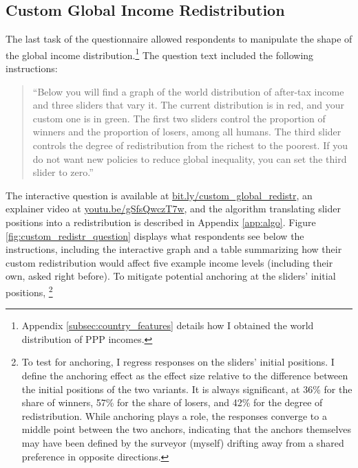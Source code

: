 \documentclass[12pt,english]{article}
\begin{document}
\begin{bibunit}

\subsection{Custom Global Income Redistribution}\label{subsec:custom_redistr}

The last task of the questionnaire allowed respondents to manipulate the shape of the global income distribution.\footnote{Appendix \ref{subsec:country_features} details how I obtained the world distribution of PPP incomes. } The question text included the following instructions: 
\begin{quote}``Below you will find a graph of the world distribution of after-tax income and three sliders that vary it. The current distribution is in red, and your custom one is in green. The first two sliders control the proportion of winners and the proportion of losers, among all humans. The third slider controls the degree of redistribution from the richest to the poorest. 
If you do not want new policies to reduce global inequality, you can set the third slider to zero.''\end{quote} 
The interactive question is available at \href{http://preferences-pol.fr/custom_global_redistr.html}{bit.ly/custom\_global\_redistr}, an explainer video at \href{https://youtu.be/gSfsQwczT7w}{youtu.be/gSfsQwczT7w}, and the algorithm translating slider positions into a redistribution is described in Appendix \ref{app:algo}. 
Figure \ref{fig:custom_redistr_question} displays what respondents see below the instructions, including the interactive graph and a table summarizing how their custom redistribution would affect five example income levels (including their own, asked right before). To mitigate potential anchoring at the sliders' initial positions,%
\footnote{To test for anchoring, I regress responses on the sliders' initial positions. %
I define the anchoring effect as the effect size relative to the difference between the initial positions of the two variants. It is always significant, at 36\% for the share of winners, 57\% for the share of losers, and 42\% for the degree of redistribution. While anchoring plays a role, the responses converge to a middle point between the two anchors, indicating that the anchors themselves may have been defined by the surveyor (myself) drifting away from a shared preference in opposite directions. %
}
\end{bibunit}
\end{document}
